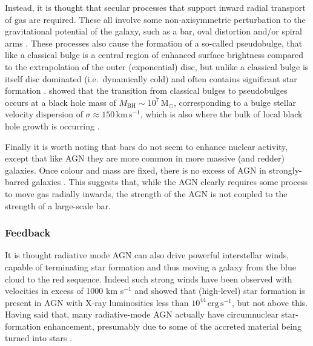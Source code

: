 			Instead, it is thought that secular processes that support inward radial transport of gas are required. These all involve some non-axisymmetric perturbation to the gravitational potential of the galaxy, such as a bar, oval distortion and/or spiral arms \citep[e.g.][]{Kormendy2004, Athanassoula2008, Sellwood2014}. These processes also cause the formation of a so-called pseudobulge, that like a classical bulge is a central region of enhanced surface brightness compared to the extrapolation of the outer (exponential) disc, but unlike a classical bulge is itself disc dominated (i.e.\ dynamically cold) and often contains significant star formation \citep[e.g.][]{Gadotti2009}. \citet{Kormendy2013a} showed that the transition from classical bulges to pseudobulges occurs at a black hole mass of $M_\text{BH} \sim 10^7\,\mathrm{M_\odot}$, corresponding to a bulge stellar velocity dispersion of $\sigma \approx 150 \, \mathrm{km \, s^{-1}}$, which is also where the bulk of local black hole growth is occurring \citep[e.g.][]{Heckman2004, Kauffmann2009}. 

			Finally it is worth noting that bars do not seem to enhance nuclear activity, except that like AGN they are more common in more massive (and redder) galaxies. Once colour and mass are fixed, there is no excess of AGN in strongly-barred galaxies \citep[e.g.][]{Lee2012, Cisternas2013}. This suggests that, while the AGN clearly requires some process to move gas radially inwards, the strength of the AGN is not coupled to the strength of a large-scale bar. 


		\subsubsection{Feedback}
			\label{subsubsec:RadiativeFeedback}
			It is thought radiative mode AGN can also drive powerful interstellar winds, capable of terminating star formation and thus moving a galaxy from the blue cloud to the red sequence. Indeed such strong winds have been observed with velocities in excess of 1000 km s$^{-1}$ \citep{Fischer2010, Feruglio2010, Rupke2011} and \citet{Page2012} showed that (high-level) star formation is present in AGN with X-ray luminosities less than $10^{44} \, \mathrm{erg \, s^{-1}}$, but not above this. Having said that, many radiative-mode AGN actually have circumnuclear star-formation enhancement, presumably due to some of the accreted material being turned into stars \citep[e.g.][]{Santini2012}. 

